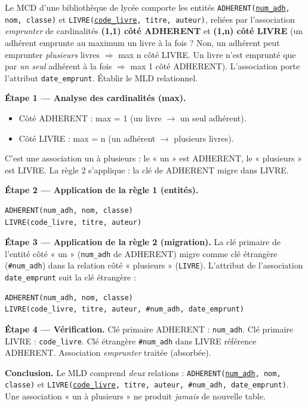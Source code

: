 \documentclass[11pt]{article}
\newcommand{\cle}[1]{{\popxbold\color{popdark}#1}}
\begin{document}
\begin{exoresolu}
Le MCD d'une bibliothèque de lycée comporte les entités \texttt{ADHERENT(\underline{num\_adh}, nom, classe)} et \texttt{LIVRE(\underline{code\_livre}, titre, auteur)}, reliées par l'association \emph{emprunter} de cardinalités \textbf{(1,1) côté ADHERENT} et \textbf{(1,n) côté LIVRE} (un adhérent emprunte au maximum un livre à la fois ? Non, un adhérent peut emprunter \emph{plusieurs} livres $\Rightarrow$ max n côté LIVRE. Un livre n'est emprunté que par \emph{un seul} adhérent à la fois $\Rightarrow$ max 1 côté ADHERENT). L'association porte l'attribut \texttt{date\_emprunt}. Établir le MLD relationnel.

\tcblower
\textbf{Étape 1 — Analyse des cardinalités (max).}
\begin{itemize}
\item Côté ADHERENT : max = 1 (un livre $\to$ un seul adhérent).
\item Côté LIVRE : max = n (un adhérent $\to$ plusieurs livres).
\end{itemize}
C'est une association \cle{un à plusieurs} : le « un » est ADHERENT, le « plusieurs » est LIVRE. La règle 2 s'applique : la clé de ADHERENT migre dans LIVRE.

\textbf{Étape 2 — Application de la règle 1 (entités).}
\begin{lstlisting}
ADHERENT(num_adh, nom, classe)
LIVRE(code_livre, titre, auteur)
\end{lstlisting}

\textbf{Étape 3 — Application de la règle 2 (migration).} La clé primaire de l'entité côté « un » (\texttt{num\_adh} de ADHERENT) migre comme clé étrangère (\texttt{\#num\_adh}) dans la relation côté « plusieurs » (\texttt{LIVRE}). L'attribut de l'association \texttt{date\_emprunt} suit la clé étrangère :
\begin{lstlisting}
ADHERENT(num_adh, nom, classe)
LIVRE(code_livre, titre, auteur, #num_adh, date_emprunt)
\end{lstlisting}

\textbf{Étape 4 — Vérification.} Clé primaire ADHERENT : \texttt{num\_adh}. Clé primaire LIVRE : \texttt{code\_livre}. Clé étrangère \texttt{\#num\_adh} dans LIVRE référence ADHERENT. Association \emph{emprunter} traitée (absorbée).

\textbf{Conclusion.} Le MLD comprend \emph{deux} relations : \texttt{ADHERENT(\underline{num\_adh}, nom, classe)} et \texttt{LIVRE(\underline{code\_livre}, titre, auteur, \#num\_adh, date\_emprunt)}. Une association « un à plusieurs » ne produit \emph{jamais} de nouvelle table.
\end{exoresolu}
\end{document}
